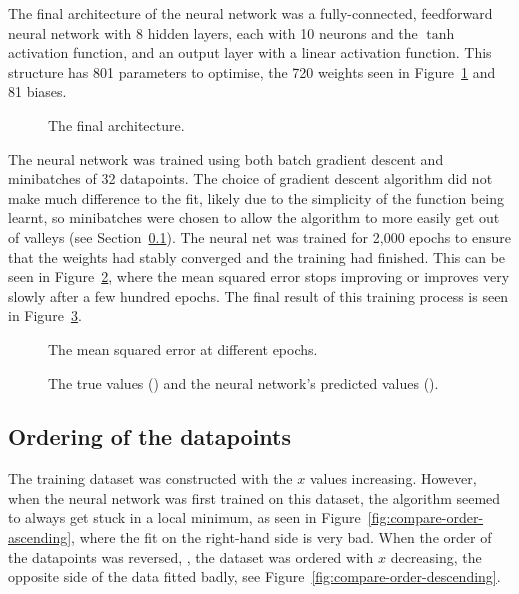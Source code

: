 The final architecture of the neural network was a fully-connected, feedforward neural network with 8 hidden layers, each with 10 neurons and the \(\tanh\) activation function, and an output layer with a linear activation function.
This structure has 801 parameters to optimise, the 720 weights seen in Figure~\ref{fig:final-ann-architecture} and 81 biases.

\begin{figure}[htbp]
	\centering
	
	\caption{The final architecture.}
	\label{fig:final-ann-architecture}
\end{figure}

The neural network was trained using both batch gradient descent and minibatches of 32 datapoints.
The choice of gradient descent algorithm did not make much difference to the fit, likely due to the simplicity of the function being learnt, so minibatches were chosen to allow the algorithm to more easily get out of valleys (see Section~\ref{sec:ordering}).
The neural net was trained for 2,000 epochs to ensure that the weights had stably converged and the training had finished.
This can be seen in Figure~\ref{fig:training-history}, where the mean squared error stops improving or improves very slowly after a few hundred epochs.
The final result of this training process is seen in Figure~\ref{fig:nn-fit}.

\begin{figure}[htbp]
	\centering
	
	\caption{The mean squared error at different epochs.}
	\label{fig:training-history}
\end{figure}

\begin{figure}[htbp]
	\centering
	
	\caption{The true values (\truthcolour) and the neural network's predicted values (\nncolour).}
	\label{fig:nn-fit}
\end{figure}

\subsection{Ordering of the datapoints} \label{sec:ordering}

The training dataset was constructed with the \(x\) values increasing.
However, when the neural network was first trained on this dataset, the algorithm seemed to always get stuck in a local minimum, as seen in Figure~\ref{fig:compare-order-ascending}, where the fit on the right-hand side is very bad.
When the order of the datapoints was reversed, \ie{}, the dataset was ordered with \(x\) decreasing, the opposite side of the data fitted badly, see Figure~\ref{fig:compare-order-descending}.


